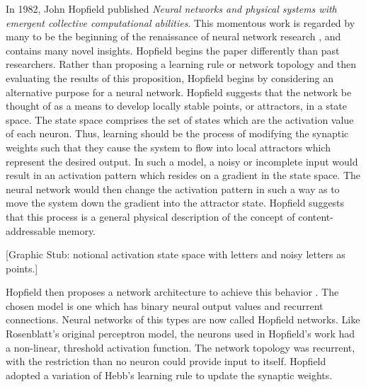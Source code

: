 \documentclass[11pt]{afthesis}
\begin{document}
	In 1982, John Hopfield published \textit{Neural networks and physical systems with emergent collective computational abilities}. This momentous work is regarded by many to be the beginning of the renaissance of neural network research \cite{anderson1988neurocomputing}, and contains many novel insights. Hopfield begins the paper differently than past researchers. Rather than proposing a learning rule or network topology and then evaluating the results of this proposition, Hopfield begins by considering an alternative purpose for a neural network. Hopfield suggests that the network be thought of as a means to develop locally stable points, or attractors, in a state space. The state space comprises the set of states which are the activation value of each neuron. Thus, learning should be the process of modifying the synaptic weights such that they cause the system to flow into local attractors which represent the desired output. In such a model, a noisy or incomplete input would result in an activation pattern which resides on a gradient in the state space. The neural network would then change the activation pattern in such a way as to move the system down the gradient into the attractor state. Hopfield suggests that this process is a general physical description of the concept of content-addressable memory.
	
	[Graphic Stub: notional activation state space with letters and noisy letters as points.]
	
	Hopfield then proposes a network architecture to achieve this behavior \cite{hopfield1982neuralnetworks}. The chosen model is one which has binary neural output values and recurrent connections. Neural networks of this types are now called Hopfield networks. Like Rosenblatt's original perceptron model, the neurons used in Hopfield's work had a non-linear, threshold activation function. The network topology was recurrent, with the restriction than no neuron could provide input to itself. Hopfield adopted a variation of Hebb's learning rule to update the synaptic weights.
	
\end{document}
